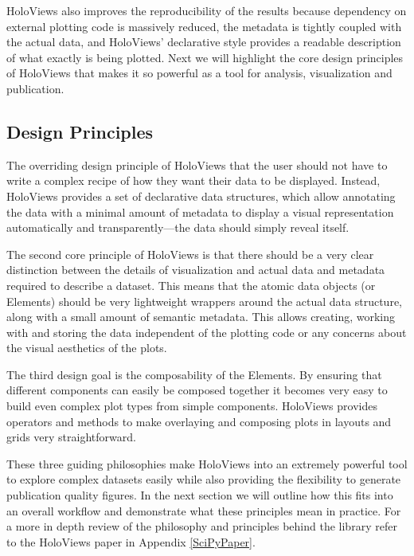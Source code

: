 HoloViews also improves the reproducibility of the results because
dependency on external plotting code is massively reduced, the
metadata is tightly coupled with the actual data, and HoloViews'
declarative style provides a readable description of what exactly is
being plotted. Next we will highlight the core design principles of
HoloViews that makes it so powerful as a tool for analysis,
visualization and publication.

\subsection{Design Principles}

The overriding design principle of HoloViews that the user should not
have to write a complex recipe of how they want their data to be
displayed.  Instead, HoloViews provides a set of declarative
data structures, which allow annotating the data with a minimal amount
of metadata to display a visual representation automatically and
transparently---the data should simply reveal itself.

The second core principle of HoloViews is that there should be a very
clear distinction between the details of visualization and actual data
and metadata required to describe a dataset. This means that the
atomic data objects (or Elements) should be very lightweight wrappers
around the actual data structure, along with a small amount of semantic
metadata. This allows creating, working with and storing the data
independent of the plotting code or any concerns about the visual
aesthetics of the plots.

The third design goal is the composability of the Elements. By
ensuring that different components can easily be composed together it
becomes very easy to build even complex plot types from simple
components. HoloViews provides operators and methods to make
overlaying and composing plots in layouts and grids very
straightforward.

These three guiding philosophies make HoloViews into an extremely
powerful tool to explore complex datasets easily while also providing
the flexibility to generate publication quality figures. In the next
section we will outline how this fits into an overall workflow and
demonstrate what these principles mean in practice. For a more in
depth review of the philosophy and principles behind the library refer
to the HoloViews paper in Appendix \ref{SciPyPaper}.


